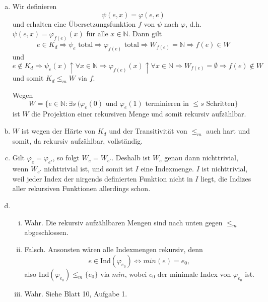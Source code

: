 \documentclass[german,headsepline]{scrartcl}
\theoremstyle{definition}
\begin{document}
	\begin{solution}
		\begin{enumerate}[(a)]
			\item Wir definieren
				\[\psi(e,x)=\varphi(e,e)\]
				und erhalten eine Übersetzungsfunktion $f$ von $\psi$ nach $\varphi$,
				d.h. $\psi(e,x)=\varphi_{f(e)}(x)$ für alle $x\in\mathbb{N}$.
				Dann gilt
				\[e\in K_d\Rightarrow\psi_e\text{ total}\Rightarrow\varphi_{f(e)}\text{ total}
				\Rightarrow W_{f(e)}=\mathbb{N}\Rightarrow f(e)\in W\]
				und
				\[e\notin K_d\Rightarrow\psi_e(x)\uparrow\forall x\in\mathbb{N}
				\Rightarrow\varphi_{f(e)}(x)\uparrow\forall x\in\mathbb{N}
				\Rightarrow W_{f(e)}=\emptyset\Rightarrow f(e)\notin W\]
				und somit $K_d\leq_mW$ via $f$.
				
				Wegen
				\[W=\{e\in\mathbb{N}\colon\exists s~(\varphi_e(0)\text{ und }\varphi_e(1)\text{ terminieren in $\leq s$ Schritten}\}\]
				ist $W$ die Projektion einer rekursiven Menge und somit rekursiv aufzählbar.
			\item $W$ ist wegen der Härte von $K_d$ und der Transitivität von $\leq_m$ auch hart und somit, da rekursiv aufzählbar, vollständig.
			\item Gilt $\varphi_e=\varphi_{e'}$, so folgt $W_e=W_{e'}$.
				Deshalb ist $W_e$ genau dann nichttrivial, wenn $W_{e'}$ nichttrivial ist, und somit ist $I$ eine Indexmenge.
				$I$ ist nichttrivial, weil jeder Index der nirgends definierten Funktion nicht in $I$ liegt,
				die Indizes aller rekursiven Funktionen allerdings schon.
			\item \begin{enumerate}[(i)]
					\item Wahr. Die rekursiv aufzählbaren Mengen sind nach unten gegen $\leq_m$ abgeschlossen.
					\item Falsch. Ansonsten wären alle Indexmengen rekursiv, denn
						\[e\in\text{Ind}(\varphi_{e_0})\Leftrightarrow min(e)=e_0,\]
						also $\text{Ind}(\varphi_{e_0})\leq_m\{e_0\}$ via $min$,
						wobei $e_0$ der minimale Index von $\varphi_{e_0}$ ist.
					\item Wahr. Siehe Blatt 10, Aufgabe 1.
				\end{enumerate}
				
		\end{enumerate}
	\end{solution}
	
\end{document}
